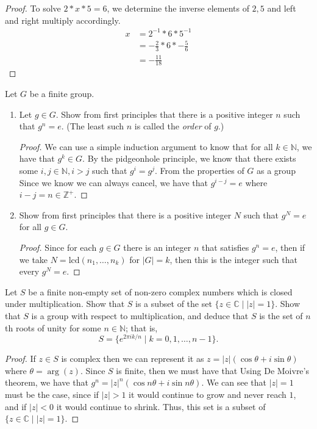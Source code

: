 \documentclass[10pt]{article}
\theoremstyle{definition}
\theoremstyle{remark}
\newcommand{\Z}{\mathbb{Z}}
\newcommand{\N}{\mathbb{N}}
\newcommand{\C}{\mathbb{C}}
\begin{document}
\begin{proof}
    To solve $2 * x * 5 = 6$, we determine the inverse elements of $2, 5$ and left
    and right multiply accordingly. 
    \begin{align*}
        x &= 2^{-1} * 6 * 5^{-1} \\
          &= -\frac{2}{3} * 6 * -\frac{5}{6} \\
          &= -\frac{11}{18}
    \end{align*}
\end{proof}

Let $G$ be a finite group. 
\begin{enumerate}[label=(\alph*)]
    \item Let $g \in G$. Show from first principles that there is a positive integer $n$ 
        such that $g^n = e$. (The least such $n$ is called the \textit{order} of $g$.) 
        \begin{proof}
            We can use a simple induction argument to know that for all $k \in \N$, 
            we have that $g^k \in G$. By the pidgeonhole principle, we know that
            there exists some $i, j \in \N, i > j$ such that $g^i = g^j$. 
            From the properties of $G$ as a group 
            Since we know we can always cancel, we have that $g^{i-j} = e$
            where $i - j = n \in \Z^+$.
        \end{proof}
    \item Show from first principles that there is a positive integer $N$ such that $g^N
        = e$ for all $g \in G$.
        \begin{proof}
            Since for each $g \in G$ there is an integer $n$ that satisfies $g^n = e$, then 
            if we take $N = \mathrm{lcd}(n_1, \ldots, n_k)$ for $|G| = k$, then 
            this is the integer such that every $g^N = e$. 
        \end{proof}
\end{enumerate}

Let $S$ be a finite non-empty set of non-zero complex numbers which is closed
under multiplication. Show that $S$ is a subset of the set $\{z \in \C \; | \; |z| =
1\}$. Show that $S$ is a group with respect to multiplication, and deduce that
$S$ is the set of $n$th roots of unity for some $n \in \N$; that is,
\[ S = \{e^{2\pi i k/n} \; | \; k = 0, 1, \ldots, n - 1 \}. \]

\begin{proof}
    If $z \in S$ is complex then we can represent it as 
    $z = |z|(\cos{\theta} + i\sin{\theta})$ where $\theta = \arg(z)$.
    Since $S$ is finite, then we must have that
    Using De Moivre's theorem, 
    we have that $g^n = |z|^n (\cos{n\theta} + i\sin{n\theta})$. We can see that 
    $|z| = 1$ must be the case, since if $|z| > 1$ it would continue to grow
    and never reach $1$, and if $|z| < 0$ it would continue to shrink. Thus,
    this set is a subset of $\{z \in \C \; | \; |z| = 1 \}$.

\end{proof}
\end{document}
